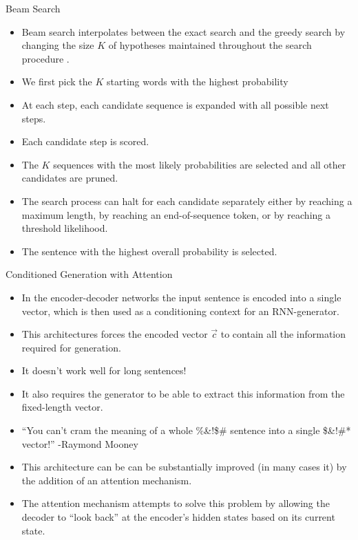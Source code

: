 \begin{frame}{Beam Search}
\begin{scriptsize}
\begin{itemize}
\item Beam search interpolates between the exact search and the greedy search by changing the size $K$ of hypotheses maintained throughout the search procedure \cite{cho2015natural}.
\item  We first pick the $K$ starting words with the highest probability 
\item At each step, each candidate sequence is expanded with all possible next steps. 
\item Each candidate step is scored. 
\item The $K$ sequences with the most likely probabilities are selected and all other candidates are pruned. 
\item The search process can halt for each candidate separately either by reaching a maximum length, by reaching an end-of-sequence token, or by reaching a threshold likelihood.
\item The sentence with the highest overall probability is selected.
\end{itemize}
        
\end{scriptsize}
\end{frame}





\begin{frame}{Conditioned Generation with Attention}
\begin{scriptsize}
\begin{itemize}
\item In the encoder-decoder networks the input sentence is encoded into a single vector, which is then used as a conditioning context for an RNN-generator. 
\item This architectures forces the encoded vector $\vec{c}$ to contain all the information required for generation.
\item It doesn't work well for long sentences!
\item It also requires the generator to be able to extract this information from the fixed-length vector.
\item ``You can't cram the meaning of a whole \%\&!\$\# sentence into a single \$\&!\#* vector!'' -Raymond Mooney
\item This architecture can be can be substantially improved (in many cases it) by the addition of an attention mechanism.
\item The attention mechanism attempts to solve this problem by allowing the decoder to “look back” at the encoder’s hidden states based on its current state. 
\end{itemize}
\end{scriptsize}
\end{frame}



